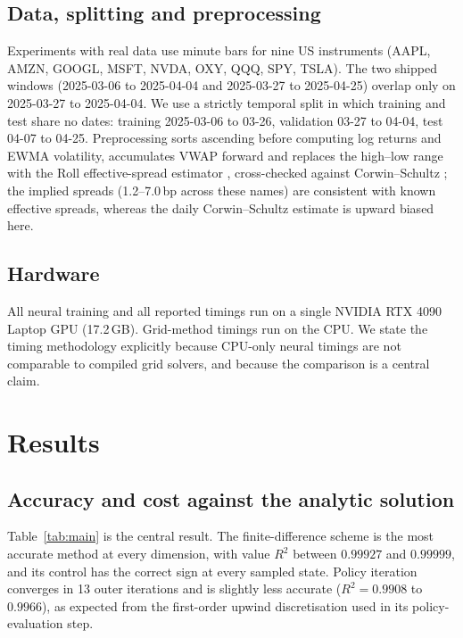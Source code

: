 \documentclass[conference]{IEEEtran}
\begin{document}
\subsection{Data, splitting and preprocessing}
Experiments with real data use minute bars for nine US instruments (AAPL, AMZN, GOOGL, MSFT,
NVDA, OXY, QQQ, SPY, TSLA). The two shipped windows (2025-03-06 to 2025-04-04 and 2025-03-27
to 2025-04-25) overlap only on 2025-03-27 to 2025-04-04. We use a strictly temporal split in
which training and test share no dates: training 2025-03-06 to 03-26, validation 03-27 to
04-04, test 04-07 to 04-25. Preprocessing sorts ascending before computing log returns and
EWMA volatility, accumulates VWAP forward and replaces the high--low range with the Roll
effective-spread estimator \cite{roll1984simple}, cross-checked against
Corwin--Schultz \cite{corwin2012simple}; the implied spreads
(1.2--7.0\,bp across these names) are consistent with known effective spreads, whereas the
daily Corwin--Schultz estimate is upward biased here.

\subsection{Hardware}
All neural training and all reported timings run on a single NVIDIA RTX 4090 Laptop GPU
(17.2\,GB). Grid-method timings run on the CPU. We state the timing methodology explicitly
because CPU-only neural timings are not comparable to compiled grid solvers, and because the
comparison is a central claim.

\section{Results}\label{sec:results}

\subsection{Accuracy and cost against the analytic solution}


Table~\ref{tab:main} is the central result. The finite-difference scheme is the most accurate
method at every dimension, with value $R^2$ between $0.99927$ and $0.99999$, and its control has
the correct sign at every sampled state. Policy iteration converges in 13 outer iterations and is
slightly less accurate ($R^2 = 0.9908$ to $0.9966$), as expected from the first-order upwind
discretisation used in its policy-evaluation step.
\end{document}
